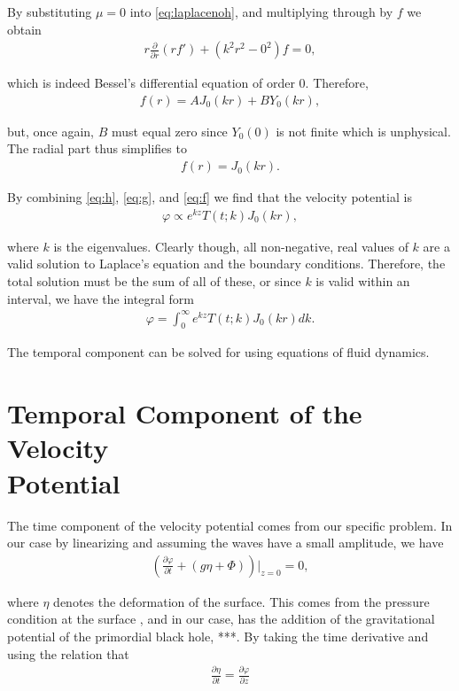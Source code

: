 By substituting $\mu = 0$ into \eqref{eq:laplacenoh}, and multiplying through by $f$ we obtain
\begin{align*}
r \frac{\partial}{\partial r}(rf') + (k^2r^2 - 0^2)f = 0,
\end{align*}

which is indeed Bessel's differential equation of order $0$. Therefore,
\begin{align*}
f(r) = A J_0(kr) + B Y_0(kr),
\end{align*}

but, once again, $B$ must equal zero since $Y_0(0)$ is not finite which is unphysical. The radial part thus simplifies to
\begin{align}
\label{eq:f}
f(r) = J_0(kr).
\end{align}

By combining \eqref{eq:h}, \eqref{eq:g}, and \eqref{eq:f} we find that the velocity potential is 
\begin{align*}
\varphi \propto e^{kz}T(t;k)J_0(kr),
\end{align*}

where $k$ is the eigenvalues. Clearly though, all non-negative, real values of $k$ are a valid solution to Laplace's equation and the boundary conditions. Therefore, the total solution must be the sum of all of these, or since $k$ is valid within an interval, we have the integral form 
\begin{align}
\label{eq:phieigen}
\varphi = \int_0^\infty e^{kz}T(t;k)J_0(kr)dk.
\end{align}

The temporal component can be solved for using equations of fluid dynamics.

\section{Temporal Component of the Velocity \\ Potential}

The time component of the velocity potential comes from our specific problem. In our case by linearizing and assuming the waves have a small amplitude, we have
\begin{align*}
\left( \frac{\partial \varphi}{\partial t} + (g \eta + \Phi) \right) \bigg|_{z=0} = 0,
\end{align*}

where $\eta$ denotes the deformation of the surface. This comes from the pressure condition at the surface \cite{fluids}, and in our case, has the addition of the gravitational potential of the primordial black hole, ***. By taking the time derivative and using the relation that
\begin{align}
\label{eq:smallamp}
\frac{\partial \eta}{\partial t} = \frac{\partial \varphi}{\partial z}
\end{align}

